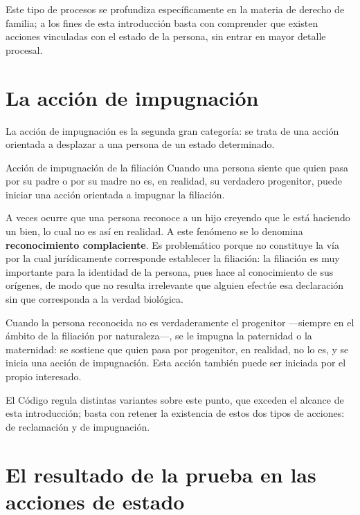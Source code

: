 \documentclass[12pt,oneside]{book}
\begin{document}
Este tipo de procesos se profundiza específicamente en la materia de derecho de familia; a los fines de esta introducción basta con comprender que existen acciones vinculadas con el estado de la persona, sin entrar en mayor detalle procesal.

\section{La acción de impugnación}

La acción de impugnación es la segunda gran categoría: se trata de una acción orientada a desplazar a una persona de un estado determinado.

\begin{example}{Acción de impugnación de la filiación}
Cuando una persona siente que quien pasa por su padre o por su madre no es, en realidad, su verdadero progenitor, puede iniciar una acción orientada a impugnar la filiación.
\end{example}

\begin{important}
A veces ocurre que una persona reconoce a un hijo creyendo que le está haciendo un bien, lo cual no es así en realidad. A este fenómeno se lo denomina \textbf{reconocimiento complaciente}. Es problemático porque no constituye la vía por la cual jurídicamente corresponde establecer la filiación: la filiación es muy importante para la identidad de la persona, pues hace al conocimiento de sus orígenes, de modo que no resulta irrelevante que alguien efectúe esa declaración sin que corresponda a la verdad biológica.
\end{important}

Cuando la persona reconocida no es verdaderamente el progenitor —siempre en el ámbito de la filiación por naturaleza—, se le impugna la paternidad o la maternidad: se sostiene que quien pasa por progenitor, en realidad, no lo es, y se inicia una acción de impugnación. Esta acción también puede ser iniciada por el propio interesado.

El Código regula distintas variantes sobre este punto, que exceden el alcance de esta introducción; basta con retener la existencia de estos dos tipos de acciones: de reclamación y de impugnación.

\section{El resultado de la prueba en las acciones de estado}
\end{document}
